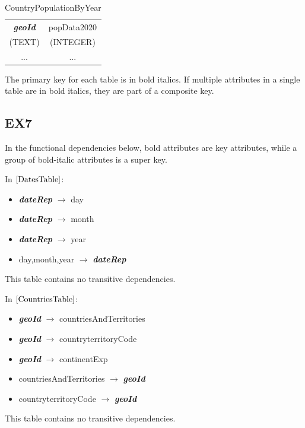 \documentclass{article}
\begin{document}
\begin{table}[ht]
\centering
\begin{tabular}{|c|c|}
    \hline
     \textbf{\textit{geoId}}&popData2020\\
     (TEXT)&(INTEGER)\\
     \hline
     ...&...\\
     \hline
\end{tabular}
\caption{CountryPopulationByYear}
\label{PopulationTable}
\end{table}

The primary key for each table is in bold italics. If multiple attributes in a single table are in bold italics, they are part of a composite key.

\subsection{EX7}

In the functional dependencies below, bold attributes are key attributes, while a group of bold-italic attributes is a super key.\newline

In $\ref{DatesTable}$:
\begin{itemize}
\item \textbf{\textit{dateRep}} $\rightarrow$ day
\item \textbf{\textit{dateRep}} $\rightarrow$ month
\item \textbf{\textit{dateRep}} $\rightarrow$ year
\item day,month,year $\rightarrow$ \textbf{\textit{dateRep}}
\end{itemize}

This table contains no transitive dependencies.\newline

In $\ref{CountriesTable}$:
\begin{itemize}
\item \textbf{\textit{geoId}} $\rightarrow$ countriesAndTerritories
\item \textbf{\textit{geoId}} $\rightarrow$ countryterritoryCode
\item \textbf{\textit{geoId}} $\rightarrow$ continentExp
\item countriesAndTerritories $\rightarrow$ \textbf{\textit{geoId}}
\item countryterritoryCode $\rightarrow$ \textbf{\textit{geoId}}
\end{itemize}

This table contains no transitive dependencies.\newline
\end{document}
